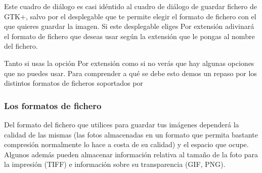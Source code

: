 Este  cuadro de  diálogo  es casi  idéntido al  cuadro  de diálogo  de
guardar  fichero de  GTK+, salvo  por  el desplegable  que te  permite
elegir el formato de fichero con  el que quieres guardar la imagen. Si
este desplegable eliges {\sf Por extensión} \gimp adivinará el formato
de fichero que deseas usar según  la extensión que le pongas al nombre
del fichero.

Tanto si usas la  opción {\sf Por extensión} como si  no verás que hay
algunas opciones  que no puedes  usar. Para  comprender a qué  se debe
esto demos un repaso por los distintos formatos de ficheros soportados
por \gimp

\subsubsection{Los formatos de fichero}

Del  formato  del  fichero  que utilices  para  guardar  tus  imágenes
dependerá  la calidad  de  las  mismas (las  fotos  almacenadas en  un
formato que permita bastante compresión normalmente lo hace a costa de
su calidad)  y el espacio  que ocupe. Algunos además  pueden almacenar
información relativa al  tamaño de la foto para la  impresión (TIFF) e
información sobre su transparencia (GIF, PNG).

